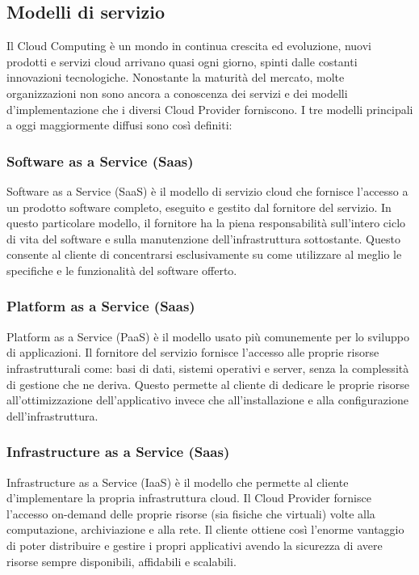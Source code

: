 \subsection{Modelli di servizio}
Il Cloud Computing è un mondo in continua crescita ed evoluzione, nuovi prodotti e servizi cloud arrivano quasi ogni giorno, spinti dalle costanti innovazioni tecnologiche.
Nonostante la maturità del mercato, molte organizzazioni non sono ancora a conoscenza dei servizi e dei modelli d'implementazione che i diversi Cloud Provider forniscono.
I tre modelli principali a oggi maggiormente diffusi sono così definiti:

\subsubsection{Software as a Service (Saas)}
Software as a Service (SaaS) è il modello di servizio cloud che fornisce l'accesso a un prodotto software completo, eseguito e gestito dal fornitore del servizio.
In questo particolare modello, il fornitore ha la piena responsabilità sull'intero ciclo di vita del software e sulla manutenzione dell'infrastruttura sottostante. Questo consente al cliente di concentrarsi esclusivamente su come utilizzare al meglio le specifiche e le funzionalità del software offerto.

\subsubsection{Platform as a Service (Saas)}
Platform as a Service (PaaS) è il modello usato più comunemente per lo sviluppo di applicazioni. Il fornitore del servizio fornisce l'accesso alle proprie risorse infrastrutturali come: basi di dati, sistemi operativi e server, senza la complessità di gestione che ne deriva. Questo permette al cliente di dedicare le proprie risorse all'ottimizzazione dell'applicativo invece che all'installazione e alla configurazione dell'infrastruttura.

\subsubsection{Infrastructure as a Service (Saas)}
Infrastructure as a Service (IaaS) è il modello che permette al cliente d'implementare la propria infrastruttura cloud. Il Cloud Provider fornisce l'accesso on-demand delle proprie risorse (sia fisiche che virtuali) volte alla computazione, archiviazione e alla rete.
Il cliente ottiene così l'enorme vantaggio di poter distribuire e gestire i propri applicativi avendo la sicurezza di avere risorse sempre disponibili, affidabili e scalabili.


